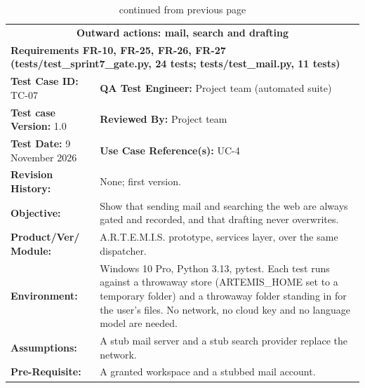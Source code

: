 \documentclass{FastFyp}
\begin{document}
{\small
{}
\begin{longtable}{|p{2.4cm}p{5.0cm}p{2.4cm}p{3.8cm}|}
\caption{Test case TC-07: outward actions.}\label{tab:tc7}\\*
\endfirsthead
\caption[]{continued from previous page}\\*
\endhead
\hline
\multicolumn{4}{|c|}{\textbf{Outward actions: mail, search and drafting}} \\* \hline
\multicolumn{4}{|p{14.8cm}|}{\textbf{Requirements FR-10, FR-25, FR-26, FR-27 (tests/test\_sprint7\_gate.py, 24 tests; tests/test\_mail.py, 11 tests)}} \\* \hline
\multicolumn{2}{|p{7.8cm}|}{\textbf{Test Case ID:} TC-07} &
  \multicolumn{2}{p{6.6cm}|}{\textbf{QA Test Engineer:} Project team (automated suite)} \\* \hline
\multicolumn{2}{|p{7.8cm}|}{\textbf{Test case Version:} 1.0} &
  \multicolumn{2}{p{6.6cm}|}{\textbf{Reviewed By:} Project team} \\* \hline
\multicolumn{2}{|p{7.8cm}|}{\textbf{Test Date:} 9 November 2026} &
  \multicolumn{2}{p{6.6cm}|}{\textbf{Use Case Reference(s):} UC-4} \\ \hline
\multicolumn{1}{|p{2.4cm}|}{\textbf{Revision History:}} &
  \multicolumn{3}{p{12.0cm}|}{None; first version.} \\ \hline
\multicolumn{1}{|p{2.4cm}|}{\textbf{Objective:}} &
  \multicolumn{3}{p{12.0cm}|}{Show that sending mail and searching the web are always gated and recorded, and that drafting never overwrites.} \\ \hline
\multicolumn{1}{|p{2.4cm}|}{\textbf{Product/Ver/ Module:}} &
  \multicolumn{3}{p{12.0cm}|}{A.R.T.E.M.I.S. prototype, services layer, over the same dispatcher.} \\ \hline
\multicolumn{1}{|p{2.4cm}|}{\textbf{Environment:}} &
  \multicolumn{3}{p{12.0cm}|}{Windows 10 Pro, Python 3.13, pytest. Each test runs against a throwaway store (ARTEMIS\_HOME set to a temporary folder) and a throwaway folder standing in for the user's files. No network, no cloud key and no language model are needed.} \\ \hline
\multicolumn{1}{|p{2.4cm}|}{\textbf{Assumptions:}} &
  \multicolumn{3}{p{12.0cm}|}{A stub mail server and a stub search provider replace the network.} \\ \hline
\multicolumn{1}{|p{2.4cm}|}{\textbf{Pre-Requisite:}} &
  \multicolumn{3}{p{12.0cm}|}{A granted workspace and a stubbed mail account.} \\ \hline

\end{longtable}}
\end{document}
